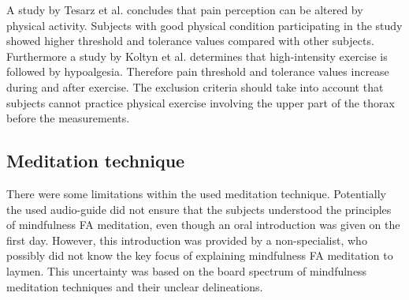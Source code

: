A study by Tesarz et al. \cite{Tesarz2012} concludes that pain perception can be altered by physical activity. Subjects with good physical condition participating in the study showed higher threshold and tolerance values compared with other subjects. %
Furthermore a study by Koltyn et al. \cite{Koltyn2002} determines that high-intensity exercise is followed by hypoalgesia. Therefore pain threshold and tolerance values increase during and after exercise. The exclusion criteria should take into account that subjects cannot practice physical exercise involving the upper part of the thorax before the measurements.
\subsection{Meditation technique}

There were some limitations within the used meditation technique. Potentially the used audio-guide did not ensure that the subjects understood the principles of mindfulness FA meditation, even though an oral introduction was given on the first day. However, this introduction was provided by a non-specialist, who possibly did not know the key focus of explaining mindfulness FA meditation to laymen. This uncertainty was based on the board spectrum of mindfulness meditation techniques and their unclear delineations. 

